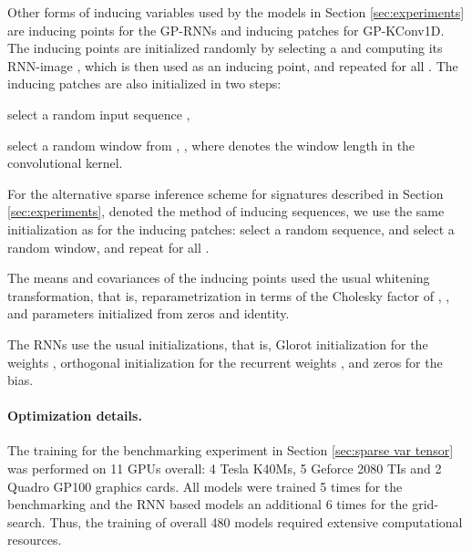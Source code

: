 \documentclass{article}
\begin{document}
Other forms of inducing variables used by the models in Section \ref{sec:experiments} are inducing points for the GP-RNNs and inducing patches for GP-KConv1D. The inducing points are initialized randomly by selecting a  and computing its RNN-image , which is then used as an inducing point, and repeated for all . The inducing patches are also initialized in two steps: \begin{enumerate*}[label=(\arabic*)] \item select a random input sequence , \item select a random window from , , where  denotes the window length in the convolutional kernel. \end{enumerate*}

For the alternative sparse inference scheme for signatures described in Section \ref{sec:experiments}, denoted the method of inducing sequences, we use the same initialization as for the inducing patches: select a random sequence, and select a random window, and repeat for all .

The means and covariances of the inducing points used the usual whitening transformation, that is, reparametrization in terms of the Cholesky factor  of , , and parameters initialized from zeros and identity.

The RNNs use the usual initializations, that is, Glorot initialization for the weights \cite{Glorot10Understanding}, orthogonal initialization for the recurrent weights \cite{Saxe2014Exact}, and zeros for the bias.

\paragraph{Optimization details.} The training for the benchmarking experiment in Section \ref{sec:sparse var tensor} was performed on 11 GPUs overall: 4 Tesla K40Ms, 5 Geforce 2080 TIs and 2 Quadro GP100 graphics cards. All models were trained 5 times for the benchmarking and the RNN based models an additional 6 times for the grid-search. Thus, the training of overall 480 models required extensive computational resources.
\end{document}
